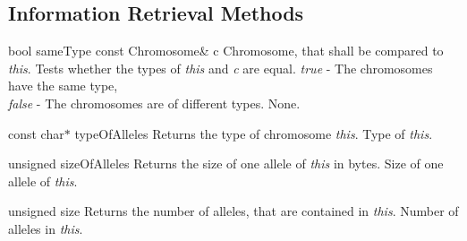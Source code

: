 \subsection{Information Retrieval Methods}

    \setConstInstance
    \printMethodWithOneParam
        {bool} 
        {sameType} 
        {const Chromosome\&}
        {c} 
        {Chromosome, that shall be compared to {\em this}.} 
        {Tests whether the types of {\em this} and {\em c} are equal.}
        {{\em true} - The chromosomes have the same type,\\
         {\em false} - The chromosomes are of different types.}
        {None.}

\clearpage

    \printEmptyMethodReturn
    {const char$\ast$} 
    {typeOfAlleles}
    {Returns the type of chromosome {\em this}.}
    {Type of {\em this}.}

\vspace*{4ex}

    \printEmptyMethodReturn
    {unsigned} 
    {sizeOfAlleles}
    {Returns the size of one allele of {\em this} in bytes.}
    {Size of one allele of {\em this}.}

\vspace*{2ex}

    \printEmptyMethodReturn
    {unsigned} 
    {size}
    {Returns the number of alleles, that are contained in {\em this}.}
    {Number of alleles in {\em this}.}
